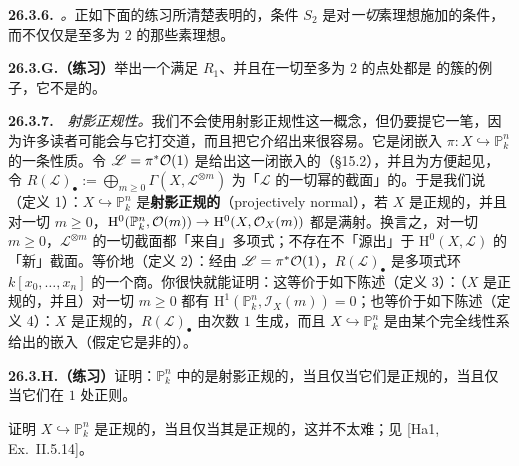\textbf{26.3.6.}\ \emph{\trhCaveat{}。}\quad 正如下面的练习所清楚表明的，条件 $S_2$ 是对\emph{一切}素理想施加的条件，而不仅仅是\trCodimension{}至多为 $2$ 的那些素理想。

\textbf{26.3.G.（练习）}\quad 举出一个满足 $R_1$、并且在一切\trCodimension{}至多为 $2$ 的点处都是 \trCM{}的簇的例子，它不是\trNormal{}的。

\textbf{26.3.7.}\ \extrahard\ \emph{射影正规性。}\quad 我们不会使用射影正规性这一概念，但仍要提它一笔，因为许多读者可能会与它打交道，而且把它介绍出来很容易。它是闭嵌入 $\pi\colon X\hookrightarrow\mathbb{P}^n_k$ 的一条性质。令 $\mathscr{L}=\pi^*\mathcal{O}(1)$ 是给出这一闭嵌入的\trLineBundle（\S15.2），并且为方便起见，令 $R(\mathscr{L})_\bullet:=\bigoplus_{m\ge0}\Gamma(X,\mathscr{L}^{\otimes m})$ 为「$\mathscr{L}$ 的一切幂的截面」的\trGradedRing。于是我们说（定义 1）：$X\hookrightarrow\mathbb{P}^n_k$ 是\textbf{射影正规的}（projectively normal），若 $X$ 是正规的，并且对一切 $m\ge0$，$\mathrm{H}^0(\mathbb{P}^n_k,\mathcal{O}(m))\to\mathrm{H}^0(X,\mathcal{O}_X(m))$ 都是满射。换言之，对一切 $m\ge0$，$\mathscr{L}^{\otimes m}$ 的一切截面都「来自」多项式；不存在不「源出」于 $\mathrm{H}^0(X,\mathscr{L})$ 的「新」截面。等价地（定义 2）：经由 $\mathscr{L}=\pi^*\mathcal{O}(1)$，$R(\mathscr{L})_\bullet$ 是多项式环 $k[x_0,\dots,x_n]$ 的一个商。你很快就能证明：这等价于如下陈述（定义 3）：（$X$ 是正规的，并且）对一切 $m\ge0$ 都有 $\mathrm{H}^1(\mathbb{P}^n_k,\mathscr{I}_X(m))=0$；也等价于如下陈述（定义 4）：$X$ 是正规的，$R(\mathscr{L})_\bullet$ 由次数 $1$ 生成，而且 $X\hookrightarrow\mathbb{P}^n_k$ 是由某个完全线性系给出的嵌入（假定它是非\trDegenerate{}的）。

\textbf{26.3.H.（练习）}\quad 证明：$\mathbb{P}^n_k$ 中的\trCompleteIntersection{}是射影正规的，当且仅当它们是正规的，当且仅当它们在\trCodimension{} $1$ 处正则。

证明 $X\hookrightarrow\mathbb{P}^n_k$ 是正规的，当且仅当其\trAffine\trCone{}是正规的，这并不太难；见 [Ha1, Ex.~II.5.14]。
